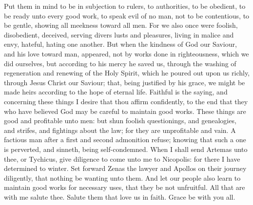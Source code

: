 Put them in mind to be in subjection to rulers, to authorities, to be obedient, to be ready unto every good work, to speak evil of no man, not to be contentious, to be gentle, showing all meekness toward all men. For we also once were foolish, disobedient, deceived, serving divers lusts and pleasures, living in malice and envy, hateful, hating one another. But when the kindness of God our Saviour, and his love toward man, appeared, not by works done in righteousness, which we did ourselves, but according to his mercy he saved us, through the washing of regeneration and renewing of the Holy Spirit, which he poured out upon us richly, through Jesus Christ our Saviour; that, being justified by his grace, we might be made heirs according to the hope of eternal life. Faithful is the saying, and concerning these things I desire that thou affirm confidently, to the end that they who have believed God may be careful to maintain good works. These things are good and profitable unto men: but shun foolish questionings, and genealogies, and strifes, and fightings about the law; for they are unprofitable and vain. A factious man after a first and second admonition refuse; knowing that such a one is perverted, and sinneth, being self-condemned.  When I shall send Artemas unto thee, or Tychicus, give diligence to come unto me to Nicopolis: for there I have determined to winter. Set forward Zenas the lawyer and Apollos on their journey diligently, that nothing be wanting unto them. And let our people also learn to maintain good works for necessary uses, that they be not unfruitful.  All that are with me salute thee. Salute them that love us in faith. Grace be with you all. 